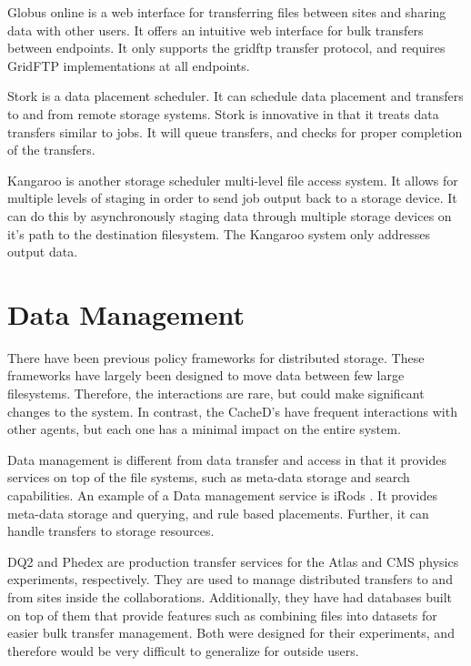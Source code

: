 Globus online \cite{foster2011globus} is a web interface for transferring files between sites and sharing data with other users.  It offers an intuitive web interface for bulk transfers between endpoints.  It only supports the gridftp \cite{allcock2005globus} transfer protocol, and requires GridFTP implementations at all endpoints.

Stork \cite{kosar2004stork} is a data placement scheduler.  It can schedule data placement and transfers to and from remote storage systems.  Stork is innovative in that it treats data transfers similar to jobs.  It will queue transfers, and checks for proper completion of the transfers.

Kangaroo \cite{thain2001kangaroo} is another storage scheduler multi-level file access system.  It allows for multiple levels of staging in order to send job output back to a storage device.  It can do this by asynchronously staging data through multiple storage devices on it's path to the destination filesystem.  The Kangaroo system only addresses output data.

\section{Data Management}

There have been previous policy frameworks for distributed storage.  These frameworks have largely been designed to move data between few large filesystems.  Therefore, the interactions are rare, but could make significant changes to the system.  In contrast, the CacheD's have frequent interactions with other agents, but each one has a minimal impact on the entire system.

Data management is different from data transfer and access in that it provides services on top of the file systems, such as meta-data storage and search capabilities.  An example of a Data management service is iRods \cite{rajasekar2010irods}.  It provides meta-data storage and querying, and rule based placements.  Further, it can handle transfers to storage resources.

DQ2 \cite{branco2008managing} and Phedex \cite{rehn2006phedex} are production transfer services for the Atlas and CMS physics experiments, respectively.  They are used to manage distributed transfers to and from sites inside the collaborations.  Additionally, they have had databases built on top of them that provide features such as combining files into datasets for easier bulk transfer management.  Both were designed for their experiments, and therefore would be very difficult to generalize for outside users.

